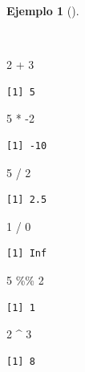 \documentclass[
  spanish,
  a4paper,
]{scrreport}
\newenvironment{Shaded}{\begin{snugshade}}{\end{snugshade}}
\newcommand{\DecValTok}[1]{\textcolor[rgb]{0.68,0.00,0.00}{#1}}
\newcommand{\SpecialCharTok}[1]{\textcolor[rgb]{0.37,0.37,0.37}{#1}}
\theoremstyle{definition}
\theoremstyle{definition}
\newtheorem{example}{Ejemplo}[chapter]
\theoremstyle{remark}
\begin{document}
\begin{example}[]\protect\hypertarget{exm-operadores-aritmeticos}{}\label{exm-operadores-aritmeticos}

~

\begin{Shaded}
\begin{Highlighting}[]
\DecValTok{2} \SpecialCharTok{+} \DecValTok{3}
\end{Highlighting}
\end{Shaded}

\begin{verbatim}
[1] 5
\end{verbatim}

\begin{Shaded}
\begin{Highlighting}[]
\DecValTok{5} \SpecialCharTok{*} \SpecialCharTok{{-}}\DecValTok{2}
\end{Highlighting}
\end{Shaded}

\begin{verbatim}
[1] -10
\end{verbatim}

\begin{Shaded}
\begin{Highlighting}[]
\DecValTok{5} \SpecialCharTok{/} \DecValTok{2}
\end{Highlighting}
\end{Shaded}

\begin{verbatim}
[1] 2.5
\end{verbatim}

\begin{Shaded}
\begin{Highlighting}[]
\DecValTok{1} \SpecialCharTok{/} \DecValTok{0}
\end{Highlighting}
\end{Shaded}

\begin{verbatim}
[1] Inf
\end{verbatim}

\begin{Shaded}
\begin{Highlighting}[]
\DecValTok{5} \SpecialCharTok{\%\%} \DecValTok{2}
\end{Highlighting}
\end{Shaded}

\begin{verbatim}
[1] 1
\end{verbatim}

\begin{Shaded}
\begin{Highlighting}[]
\DecValTok{2} \SpecialCharTok{\^{}} \DecValTok{3}
\end{Highlighting}
\end{Shaded}

\begin{verbatim}
[1] 8
\end{verbatim}

\end{example}
\end{document}
